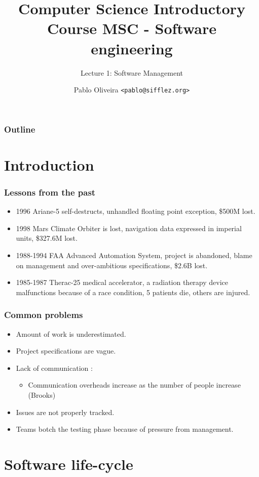 \documentclass[10pt, handout]{beamer}
\title{Computer Science Introductory Course MSC - Software engineering}
\subtitle{Lecture 1: Software Management}
\author[Pablo Oliveira]{Pablo Oliveira \texttt{<pablo@sifflez.org>}}
\institute{ENST}
\date{}
\begin{document}
\begin{frame}
  \titlepage
\end{frame}

\begin{frame}
  \frametitle{Outline}
  \tableofcontents
\end{frame}

\section{Introduction}
\begin{frame}[fragile]
  \frametitle{Lessons from the past}
  \begin{itemize}
  \item 1996 Ariane-5 self-destructs, unhandled floating point exception,
    \$500M lost.
  \item 1998 Mars Climate Orbiter is lost, navigation data expressed in imperial
    units, \$327.6M lost.
  \item 1988-1994 FAA Advanced Automation System, project is abandoned, blame
    on management and over-ambitious specifications, \$2.6B lost.
  \item 1985-1987 Therac-25 medical accelerator, a radiation therapy device
    malfunctions because of a race condition, 5 patients die, others are injured.
  \end{itemize}
\end{frame}

\begin{frame}[fragile]
  \frametitle{Common problems}
  \begin{itemize}
  \item Amount of work is underestimated.
  \item Project specifications are vague.
  \item Lack of communication :
    \begin{itemize}
    \item Communication overheads increase as the number of people increase
      (Brooks)
    \end{itemize}
  \item Issues are not properly tracked.
  \item Teams botch the testing phase because of pressure from management.
  \end{itemize}
\end{frame}

\section{Software life-cycle}
\end{document}
